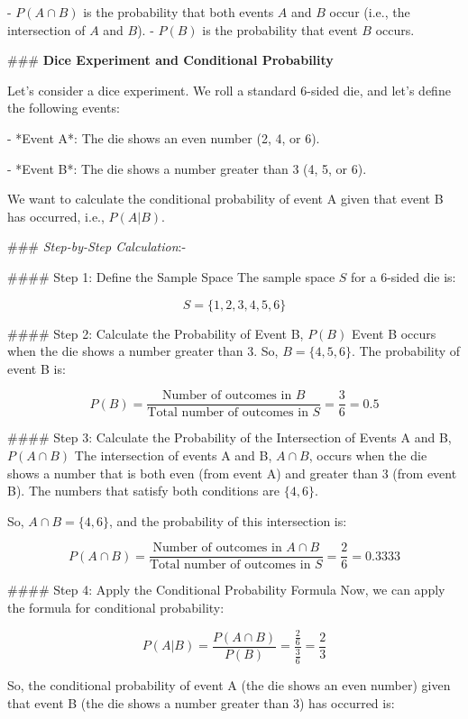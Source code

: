 \documentclass{report}
\begin{document}
- \( P(A \cap B) \) is the probability that both events \( A \) and \( B \) occur (i.e., the intersection of \( A \) and \( B \)).
- \( P(B) \) is the probability that event \( B \) occurs.



### \textbf{Dice Experiment and Conditional Probability}




Let's consider a dice experiment. We roll a standard 6-sided die, and let’s define the following events:


- *Event A*: The die shows an even number (2, 4, or 6).

- *Event B*: The die shows a number greater than 3 (4, 5, or 6).

We want to calculate the conditional probability of event A given that event B has occurred, i.e., \( P(A | B) \).

### \textit{Step-by-Step Calculation}:-


#### Step 1: Define the Sample Space
The sample space \( S \) for a 6-sided die is:

\[
S = \{1, 2, 3, 4, 5, 6\}
\]

#### Step 2: Calculate the Probability of Event B, \( P(B) \)
Event B occurs when the die shows a number greater than 3. So, \( B = \{4, 5, 6\} \). The probability of event B is:

\[
P(B) = \frac{\text{Number of outcomes in } B}{\text{Total number of outcomes in } S} = \frac{3}{6} = 0.5
\]

#### Step 3: Calculate the Probability of the Intersection of Events A and B, \( P(A \cap B) \)
The intersection of events A and B, \( A \cap B \), occurs when the die shows a number that is both even (from event A) and greater than 3 (from event B). The numbers that satisfy both conditions are \( \{4, 6\} \).

So, \( A \cap B = \{4, 6\} \), and the probability of this intersection is:

\[
P(A \cap B) = \frac{\text{Number  of  outcomes  in  } A \cap B}{\text{Total number  of  outcomes  in }  S} = \frac{2}{6} = 0.3333
\]

#### Step 4: Apply the Conditional Probability Formula
Now, we can apply the formula for conditional probability:

\[
P(A | B) = \frac{P(A \cap B)}{P(B)} = \frac{\frac{2}{6}}{\frac{3}{6}} = \frac{2}{3}
\]

So, the conditional probability of event A (the die shows an even number) given that event B (the die shows a number greater than 3) has occurred is:
\end{document}
